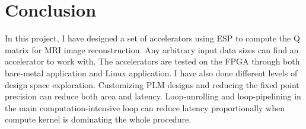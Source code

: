 \section{Conclusion}

In this project, I have designed a set of accelerators using ESP to compute the
Q matrix for MRI image reconstruction. Any arbitrary input data sizes can find
an accelerator to work with. The accelerators are tested on the FPGA through
both bare-metal application and Linux application. I have also done different
levels of design space exploration. Customizing PLM designs and reducing the
fixed point precision can reduce both area and latency. Loop-unrolling and
loop-pipelining in the main computation-intensive loop can reduce latency
proportionally when compute kernel is dominating the whole procedure.

